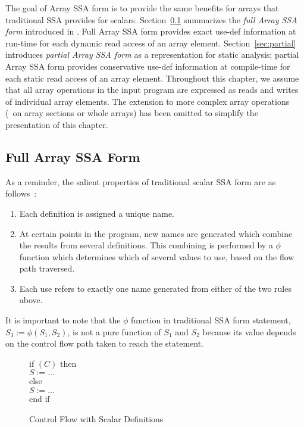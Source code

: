 The goal of Array SSA form is to provide the same benefits for arrays
that traditional SSA provides for scalars.
Section~\ref{sec:full} summarizes the {\it full Array SSA form} introduced
in \cite{KnSa98}.  Full Array SSA form provides exact use-def information 
at run-time for each dynamic read access of an array element.
Section~\ref{sec:partial} introduces {\it partial Array SSA form}
as a  representation for static analysis; partial Array SSA form provides
conservative use-def information at compile-time for each static
read access of an array element.
Throughout this chapter,
we assume that all array operations in the input program are
expressed as reads and writes of individual array elements.  The
extension to more complex array operations (\eg\ on array sections or whole arrays)
has been
omitted to simplify the presentation of this chapter.

\subsection{Full Array SSA Form}\label{sec:full}
As a reminder, 
the salient properties of traditional scalar
SSA form are as follows~\cite{CFRWZ91a}:
\begin{enumerate}

\item Each definition is assigned a unique name.

\item At certain points in the program, new names are generated which
combine the results from several definitions.
This combining is performed by a $\phi$ function which
determines which of several values to use, based on the flow path
traversed.  

\item Each use refers to exactly one name generated from either
of the two rules above.
\end{enumerate}
It is important
to note that the $\phi$ function in traditional SSA form statement,  $S_3 := \phi (S_1,S_2)$,
is not a pure function of $S_1$ and $S_2$ because its value
depends on the control flow path taken to reach the statement.



\begin{figure}%
\begin{center}
\parbox{3.0in}{
\begin{programa}
\Ta  if $(C)$ then  \\
\Tb  $S := \ldots$   \\
\Ta  else     \\
\Tb  $S := \ldots$  \\
\Ta  end if 
\end{programa}
}
\end{center}
\caption{Control Flow with Scalar Definitions}
\label{scalar-source}
\end{figure}

